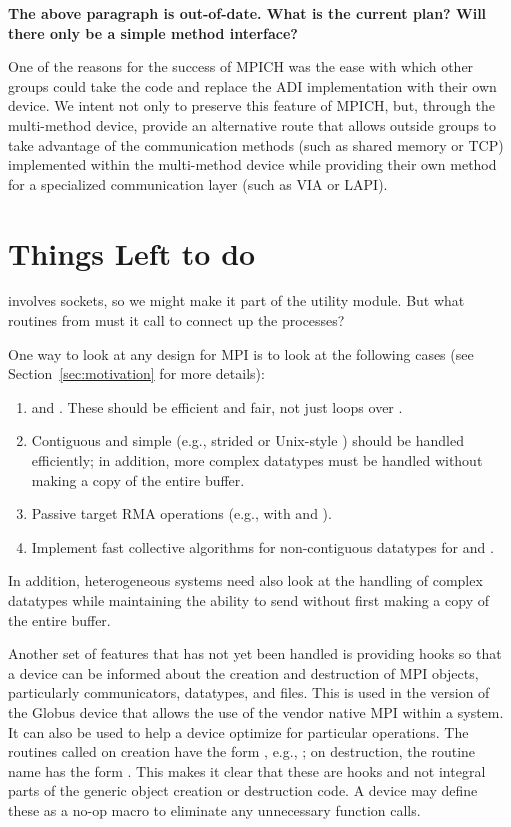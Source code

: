 \documentclass[dvipdfm]{article}
\begin{document}
\textbf{The above paragraph is out-of-date.  What is the current plan?
Will there only be a simple method interface?}

One of the reasons for the success of MPICH was the ease with which
other groups could take the code and replace the ADI implementation
with their own device.  We intent not only to preserve this feature of
MPICH, but, through the multi-method device, provide an alternative
route that allows outside groups to take advantage of the
communication methods (such as shared memory or TCP) implemented
within the multi-method device while providing their own method for a
specialized communication layer (such as VIA or LAPI).

\section{Things Left to do}

 involves sockets, so we might make it part of the
utility module.  But what routines from  must it call
to connect up the processes?

One way to look at any design for MPI is to look at the following
cases (see Section~\ref{sec:motivation} for more details):
\begin{enumerate}
\item {} and .  These should be
efficient and fair, not just loops over .
\item Contiguous and simple (e.g., strided or Unix-style ) should 
be handled efficiently; in addition, more complex datatypes must be handled
without making a copy of the entire buffer.  
\item Passive target RMA operations (e.g.,  with
 and ).
\item Implement fast collective algorithms for non-contiguous
datatypes for  and .
\end{enumerate}
In addition, heterogeneous systems need also look at the handling of
complex datatypes while maintaining the ability to send without first
making a copy of the entire buffer.

Another set of features that has not yet been handled is providing
hooks so that a device can be informed about the creation and
destruction of MPI objects, particularly communicators, datatypes, and
files.  This is used in the version of the Globus device that allows
the use of the vendor native MPI within a system.  It can also be used
to help a device optimize for particular operations.  
The routines called on creation have the form
, e.g.,
; on destruction, the routine name has
the form . This makes  
it clear that these are hooks and not integral parts of the generic
object creation or destruction code.  A device may define these as a
no-op macro to eliminate any unnecessary function calls.
\end{document}
